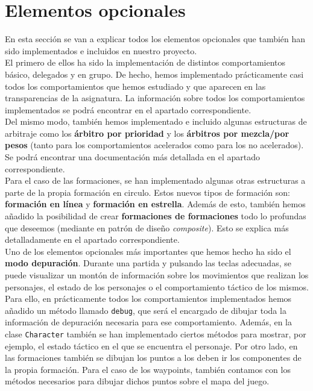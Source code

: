 \medskip
\section{Elementos opcionales}

En esta sección se van a explicar todos los elementos opcionales que también han sido implementados e incluidos en nuestro proyecto. \\

El primero de ellos ha sido la implementación de distintos comportamientos básico, delegados y en grupo. De hecho, hemos implementado prácticamente casi todos los comportamientos que hemos estudiado y que aparecen en las transparencias de la asignatura. La información sobre todos los comportamientos implementados se podrá encontrar en el apartado correspondiente. \\

Del mismo modo, también hemos implementado e incluido algunas estructuras de arbitraje como los \textbf{árbitro por prioridad} y los \textbf{árbitros por mezcla/por pesos} (tanto para los comportamientos acelerados como para los no acelerados). Se podrá encontrar una documentación más detallada en el apartado correspondiente. \\

Para el caso de las formaciones, se han implementado algunas otras estructuras a parte de la propia formación en circulo. Estos nuevos tipos de formación son: \textbf{formación en línea} y \textbf{formación en estrella}. Además de esto, también hemos añadido la posibilidad de crear \textbf{formaciones de formaciones} todo lo profundas que deseemos (mediante en patrón de diseño \textit{composite}). Esto se explica más detalladamente en el apartado correspondiente. \\

Uno de los elementos opcionales más importantes que hemos hecho ha sido el \textbf{modo depuración}. Durante una partida y pulsando las teclas adecuadas, se puede visualizar un montón de información sobre los movimientos que realizan los personajes, el estado de los personajes o el comportamiento táctico de los mismos. Para ello, en prácticamente todos los comportamientos implementados hemos añadido un método llamado \texttt{debug}, que será el encargado de dibujar toda la información de depuración necesaria para ese comportamiento. Además, en la clase \texttt{Character} también se han implementado ciertos métodos para mostrar, por ejemplo, el estado táctico en el que se encuentra el personaje. Por otro lado, en las formaciones también se dibujan los puntos a los deben ir los componentes de la propia formación. Para el caso de los waypoints, también contamos con los métodos necesarios para dibujar dichos puntos sobre el mapa del juego. \\

